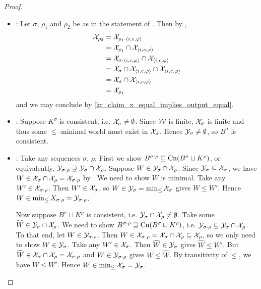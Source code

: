 \begin{proof}
\begin{itemize}
    \item \duprem{}: Let $\sigma$, $\rho_1$ and $\rho_2$ be as
          in the statement of \duprem{}. Then by
          \kconj{},
          \begin{align*}
            \mathcal{X}_{\rho_2}
            &= \mathcal{X}_{\rho_1 \cdot \langle {i, c, \varphi} \rangle} \\
            &= \mathcal{X}_{\rho_1} \cap \mathcal{X}_{\langle {i, c, \varphi} \rangle} \\
            &= \mathcal{X}_{\sigma \cdot \langle {i, c, \varphi} \rangle} \cap \mathcal{X}_{\langle {i, c,
            \varphi} \rangle} \\
            &= \mathcal{X}_{\sigma} \cap \mathcal{X}_{\langle {i, c, \varphi} \rangle} \cap \mathcal{X}_{\langle {i, c,
            \varphi} \rangle} \\
            &= \mathcal{X}_{\sigma} \cap \mathcal{X}_{\langle {i, c, \varphi} \rangle} \\
            &= \mathcal{X}_{\rho_1}
          \end{align*}
          and we may conclude by \cref{kr_claim_x_equal_implies_output_equal}.
    \item \condcons{}: Suppose $K^\sigma$ is consistent,
          i.e. $\mathcal{X}_\sigma \ne \emptyset$. Since $\mathcal{W}$ is finite, $\mathcal{X}_\sigma$ is
          finite and thus some $\le$-minimal world must exist in $\mathcal{X}_\sigma$.
          Hence $\mathcal{Y}_\sigma \ne \emptyset$, so $B^\sigma$ is consistent.
    \item \incvac{}: Take any sequences $\sigma$, $\rho$. First
          we show $B^{\sigma \cdot \rho} \sqsubseteq \operatorname{Cn}(B^\sigma \sqcup
          K^\rho)$, or equivalently, $\mathcal{Y}_{\sigma \cdot \rho} \supseteq
          \mathcal{Y}_\sigma \cap \mathcal{X}_\rho$. Suppose $W \in \mathcal{Y}_\sigma \cap \mathcal{X}_\rho$.
          Since $\mathcal{Y}_\sigma \subseteq \mathcal{X}_\sigma$, we have $W \in \mathcal{X}_\sigma \cap
          \mathcal{X}_\rho = \mathcal{X}_{\sigma \cdot \rho}$ by \kconj{}. We need
          to show $W$ is minimal. Take any $W' \in \mathcal{X}_{\sigma \cdot \rho}$.
          Then $W' \in \mathcal{X}_{\sigma}$, so $W \in \mathcal{Y}_\sigma =
          \min_{\le}{\mathcal{X}_\sigma}$ gives $W \le W'$. Hence $W \in
          \min_{\le}{X_{\sigma \cdot \rho}} = \mathcal{Y}_{\sigma \cdot \rho}$.

          Now suppose $B^\sigma \sqcup K^\rho$ is consistent, i.e. $\mathcal{Y}_\sigma
          \cap \mathcal{X}_\rho \ne \emptyset$. Take some $\widehat{W} \in \mathcal{Y}_\sigma
          \cap \mathcal{X}_\rho$. We need to show $B^{\sigma \cdot \rho} \sqsupseteq
          \operatorname{Cn}(B^\sigma \sqcup K^\rho)$, i.e. $\mathcal{Y}_{\sigma \cdot \rho}
          \subseteq \mathcal{Y}_\sigma \cap \mathcal{X}_\rho$. To that end, let $W \in \mathcal{Y}_{\sigma
          \cdot \rho}$. Then $W \in \mathcal{X}_{\sigma \cdot \rho} = \mathcal{X}_\sigma \cap
          \mathcal{X}_\rho \subseteq \mathcal{X}_\rho$, so we only need to show $W \in
          \mathcal{Y}_\sigma$. Take any $W' \in \mathcal{X}_\sigma$. Then $\widehat{W} \in
          \mathcal{Y}_\sigma$ gives $\widehat{W} \le W'$. But $\widehat{W} \in \mathcal{X}_\sigma
          \cap \mathcal{X}_\rho = \mathcal{X}_{\sigma \cdot \rho}$ and $W \in \mathcal{Y}_{\sigma
          \cdot \rho}$ gives $W \le \widehat{W}$. By transitivity of $\le$,
          we have $W \le W'$.  Hence $W \in \min_{\le}{\mathcal{X}_\sigma} = \mathcal{Y}_\sigma$.


\end{itemize}
\end{proof}
